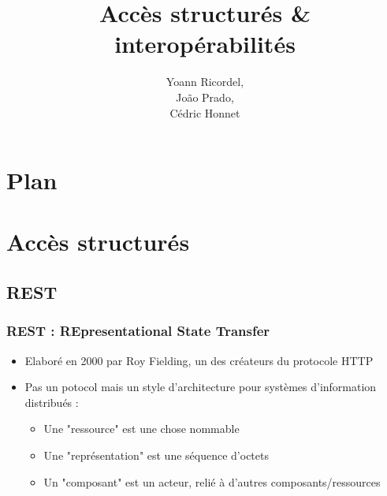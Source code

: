 \documentclass{beamer}
\begin{document}
\title{Accès structurés \& interopérabilités}
\author{Yoann Ricordel, \\João Prado, \\Cédric Honnet}
\titlepage

\section{Plan}
    \begin{frame}
        \tableofcontents
    \end{frame}

\section{Accès structurés}

    \subsection{REST}
        \begin{frame}
            \frametitle{REST : REpresentational State Transfer}
            \begin{itemize}
            \item Elaboré en 2000 par Roy Fielding, un des créateurs du protocole HTTP
            \item Pas un potocol mais un style d’architecture pour systèmes d'information distribués :
                \begin{itemize}
                \item Une "ressource" est une chose nommable
                \item Une "représentation" est une séquence d’octets
                \item Un "composant" est un acteur, relié à d’autres composants/ressources
                \end{itemize}
            \end{itemize}
        \end{frame}
\end{document}
